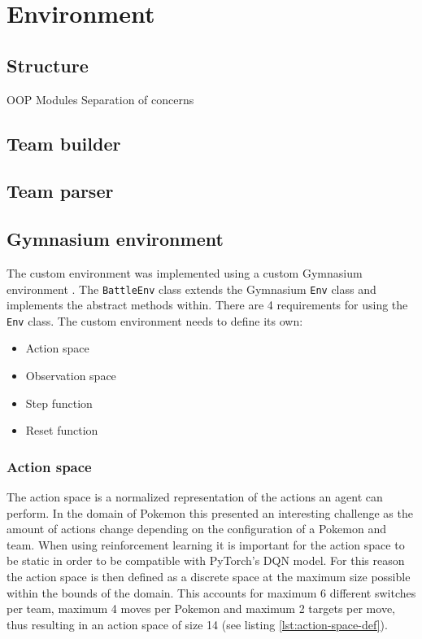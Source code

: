 \section{Environment}
\label{sec:environment}

\subsection{Structure}
OOP
Modules
Separation of concerns

\subsection{Team builder}

\subsection{Team parser}

\subsection{Gymnasium environment}
The custom environment was implemented using a custom Gymnasium \cite{Gymnasium} environment \cite{GymnasiumCustomEnv}.
The \lstinline|BattleEnv| class extends the Gymnasium \lstinline|Env| class and implements the abstract methods within.
There are 4 requirements for using the \lstinline|Env| class. The custom environment needs to define its own:

\begin{itemize}
    \item Action space
    \item Observation space
    \item Step function
    \item Reset function
\end{itemize}

\subsubsection{Action space}
The action space is a normalized representation of the actions an agent can perform. In the domain of Pokemon this presented
an interesting challenge as the amount of actions change depending on the configuration of a Pokemon and team. When using
reinforcement learning it is important for the action space to be static in order to be compatible with PyTorch's DQN model.
For this reason the action space is then defined as a discrete space at the maximum size possible within the bounds of the domain.
This accounts for maximum 6 different switches per team, maximum 4 moves per Pokemon and maximum 2 targets per move, thus
resulting in an action space of size 14 (see listing \ref{lst:action-space-def}).

